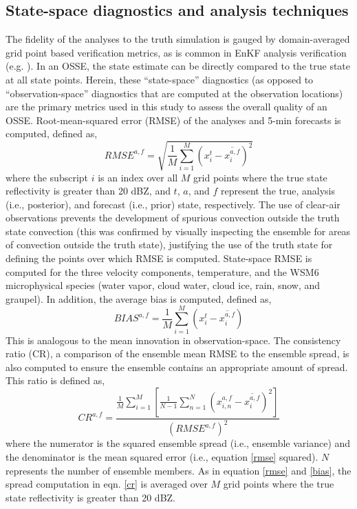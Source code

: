 \subsection{State-space diagnostics and analysis techniques}
\label{statespace}
The fidelity of the analyses to the truth simulation is gauged by domain-averaged grid point based verification metrics, as is common in EnKF analysis verification (e.g. \citealt{dowelletal04}). In an OSSE, the state estimate can be directly compared to the true state at all state points. Herein, these “state-space” diagnostics (as opposed to “observation-space” diagnostics that are computed at the observation locations) are the primary metrics used in this study to assess the overall quality of an OSSE. Root-mean-squared error (RMSE) of the analyses and 5-min forecasts is computed, defined as,
\begin{equation}
   RMSE^{a,f} = \sqrt{\frac{1}{M}\sum_{i=1}^{M} (x_i^t - \overline{x_i^{a,f}})^2} 
\label{rmse}
\end{equation}
where the subscript \(i\) is an index over all \(M\) grid points where the true state reflectivity is greater than 20 dBZ, and \(t\), \(a\), and \(f\) represent the true, analysis (i.e., posterior), and forecast (i.e., prior) state, respectively. The use of clear-air observations prevents the development of spurious convection outside the truth state convection (this was confirmed by visually inspecting the ensemble for areas of convection outside the truth state), justifying the use of the truth state for defining the points over which RMSE is computed. State-space RMSE is computed for the three velocity components, temperature, and the WSM6 microphysical species (water vapor, cloud water, cloud ice, rain, snow, and graupel). In addition, the average bias is computed, defined as,
\begin{equation}
   BIAS^{a,f} = \frac{1}{M}\sum_{i=1}^{M} (x_i^t - \overline{x_i^{a,f}})
\label{bias}
\end{equation}
This is analogous to the mean innovation in observation-space. The consistency ratio (CR), a comparison of the ensemble mean RMSE to the ensemble spread, is also computed to ensure the ensemble contains an appropriate amount of spread. This ratio is defined as,
\begin{equation}
   CR^{a,f} = \frac{\frac{1}{M}\sum_{i=1}^{M} [\frac{1}{N-1}\sum_{n=1}^{N}(x_{i,n}^{a,f} - \overline{x_i^{a,f}})^2]}{(RMSE^{a,f})^2}
\label{cr}
\end{equation}
where the numerator is the squared ensemble spread (i.e., ensemble variance) and the denominator is the mean squared error (i.e., equation \ref{rmse} squared). \(N\) represents the number of ensemble members. As in equation \ref{rmse} and \ref{bias}, the spread computation in eqn. \ref{cr} is averaged over \(M\) grid points where the true state reflectivity is greater than 20 dBZ.


